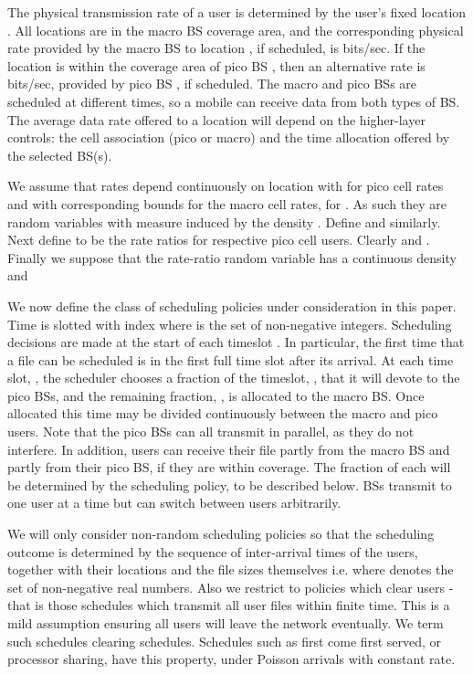 \documentclass[12pt, draftcls, onecolumn]{IEEEtranTCOM}
\begin{document}
The physical transmission rate of a user is determined by the user's fixed
location . All locations are in the macro BS coverage area, and the
corresponding physical rate provided by the macro BS to location , if scheduled, is  bits/sec. If the location is
within the coverage area of pico BS , then an alternative rate is  bits/sec, provided by pico BS , if scheduled. The macro and pico BSs are scheduled at different times, so a mobile can receive data from
both types of BS. The average data rate offered to a location will depend on the higher-layer controls: the cell association (pico or macro) and the time allocation
offered by the selected BS(s). 

We assume that rates depend continuously on location
with  for pico cell rates
and with corresponding bounds for the macro cell rates,  for .
As such they are random variables with measure induced by the density .
Define  and  similarly. Next
define  to be the rate ratios for respective pico cell users. Clearly
 and
. Finally we suppose that the rate-ratio
random variable has a continuous density  and 



We now define the class of scheduling policies under consideration in this paper. Time is slotted with index  where  is the set of non-negative integers. Scheduling decisions are made at the start of each timeslot .  In particular, the first time that a file can be scheduled is in the first full time slot after its arrival. At each time slot, , the scheduler chooses a fraction of the timeslot, , that it will devote to the pico BSs, and the remaining fraction, , is allocated to the macro BS.  Once allocated this time may be divided continuously between the macro and pico users. Note that the pico BSs can all transmit in parallel, as they do not interfere. In addition, users can receive their file partly from the macro BS and partly from their pico BS, if they are within coverage. The fraction of each will be determined by the scheduling policy, to be described below. BSs transmit to one user at a time but can switch between users arbitrarily.

We will only consider non-random scheduling policies so that the scheduling outcome is determined
by the sequence of inter-arrival times of the users, together with their locations and the file sizes themselves i.e. 
where  denotes the set of non-negative real numbers.  Also we restrict to policies which clear users -
that is those schedules which transmit all user files within finite time. This is a mild assumption ensuring
all users will leave the network eventually. We term such schedules clearing schedules. Schedules such as first come first served, or processor sharing, have this property,
under Poisson arrivals with constant rate.
\end{document}
